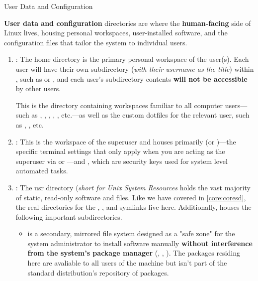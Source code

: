 \documentclass[10pt]{article}
\begin{document}
    \begin{core}{User Data and Configuration}

      \textbf{User data and configuration} directories are where the \textbf{human-facing} side of Linux lives, housing personal workspaces, user-installed software, and the configuration files that tailor the system to individual users.

      \begin{enumerate}

        \item {} : The home directory is the primary personal workspace of the user(s). Each user will have their own subdirectory (\textit{with their username as the title}) within , such as  or , and each user's subdirectory contents \textbf{will not be accessible} by other users.

        This is the directory containing workspaces familiar to all computer users---such as , , , , , etc.---as well as the custom dotfiles for the relevant user, such as , , etc.

        \item {} : This is the workspace of the superuser and houses primarily  (or )---the specific terminal settings that only apply when you are acting as the superuser via  or ---and , which are security keys used for system level automated tasks.

        \item {} : The usr directory (\textit{short for Unix System Resources} holds the vast majority of static, read-only software and files. Like we have covered in \autoref{core:coresd}, the real directories for the , , and  symlinks live here. Additionally,  houses the following important subdirectories.

        \begin{itemize}

          \item {} is a secondary, mirrored file system designed as a "safe zone" for the system administrator to install software manually \textbf{without interference from the system's package manager} (, , ). The packages residing here are avaliable to all users of the machine but isn't part of the standard distribution's repository of packages.


\end{itemize}
\end{enumerate}
\end{core}
\end{document}
